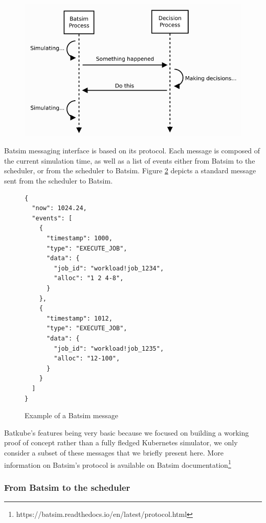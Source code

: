 \begin{figure}[H]
	\centering
	\includegraphics[scale=0.5]{imgs/batsim-sequence-diag.png}
	\label{fig:bati-seq-diag}
\end{figure}

Batsim messaging interface is based on its protocol. Each message is composed
of the current simulation time, as well as a list of events either from Batsim
to the scheduler, or from the scheduler to Batsim. Figure \ref{fig:batmsg_ex}
depicts a standard message sent from the scheduler to Batsim.

\begin{figure}
\begin{verbatim}
{
  "now": 1024.24,
  "events": [
    {
      "timestamp": 1000,
      "type": "EXECUTE_JOB",
      "data": {
        "job_id": "workload!job_1234",
        "alloc": "1 2 4-8",
      }
    },
    {
      "timestamp": 1012,
      "type": "EXECUTE_JOB",
      "data": {
        "job_id": "workload!job_1235",
        "alloc": "12-100",
      }
    }
  ]
}
\end{verbatim}
\caption{Example of a Batsim message}
\label{fig:batmsg_ex}
\end{figure}

Batkube's features being very basic because we focused on building a working
proof of concept rather than a fully fledged Kubernetes simulator, we only
consider a subset of these messages that we briefly present here. More
information on Batsim's protocol is available on Batsim
documentation\footnote{https://batsim.readthedocs.io/en/latest/protocol.html}

\subsubsection{From Batsim to the scheduler}

